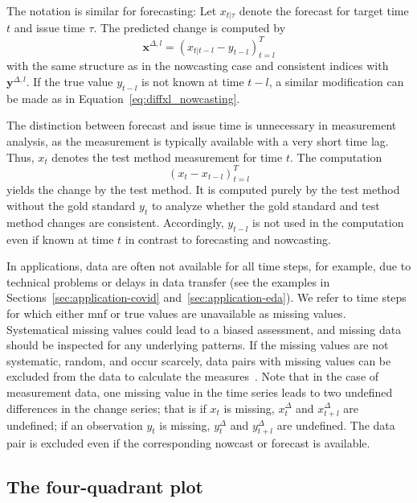 \documentclass[pdflatex]{sn-jnl}
\theoremstyle{plain}%
\theoremstyle{definition}
\newcommand{\diffxl}{\mathbf{x}^{\Delta,l}}
\newcommand{\diffyl}{\mathbf{y}^{\Delta,l}}
\newcommand{\diffxt}[1][t]{x^{\Delta}_{#1}}
\newcommand{\diffyt}[1][t]{y^{\Delta}_{#1}}
\begin{document}
The notation is similar for forecasting: Let $x_{t | \tau}$ denote the forecast for target time $t$ and issue time $\tau$.
The predicted change is computed by
\begin{equation} \diffxl = (x_{t|t-l} - y_{t-l})^T_{t=l}\label{eq:diffxl_forecasting}
\end{equation}
with the same structure as in the nowcasting case and consistent indices with $\diffyl$.
If the true value $y_{t-l}$ is not known at time $t-l$, a similar modification can be made as in Equation~\eqref{eq:diffxl_nowcasting}.


The distinction between forecast and issue time is unnecessary in measurement analysis, as the measurement is typically available with a very short time lag.
Thus, $x_t$ denotes the test method measurement for time $t$.
The computation
\begin{equation}
  (x_{t} - x_{t-l})_{t=l}^T \label{eq:diffxl_measure}
\end{equation}
yields the change by the test method.
It is computed purely by the test method without the gold standard $y_t$ to analyze whether the gold standard and test method changes are consistent.
Accordingly, $y_{t-l}$ is not used in the computation even if known at time $t$ in contrast to forecasting and nowcasting.

In applications, data are often not available for all time steps, for example, due to technical problems or delays in data transfer (see the examples in Sections~\ref{sec:application-covid} and~\ref{sec:application-eda}).
We refer to time steps for which either \ac{mnf} or true values are unavailable as missing values.
Systematical missing values could lead to a biased assessment, and missing data should be inspected for any underlying patterns.
If the missing values are not systematic, random, and occur scarcely, data pairs with missing values can be excluded from the data to calculate the measures~\parencite[see][Section 1.3]{VanBuuren2018}.
Note that in the case of measurement data, one missing value in the time series leads to two undefined differences in the change series; that is if $x_t$ is missing, $\diffxt$ and $\diffxt[t+l]$ are undefined; if an observation $y_t$ is missing, $\diffyt$ and $\diffyt[t+l]$ are undefined.
The data pair is excluded even if the corresponding nowcast or forecast is available.



\subsection{The four-quadrant plot}\label{subsec:aatc-four-quadrant-plot}
\end{document}
